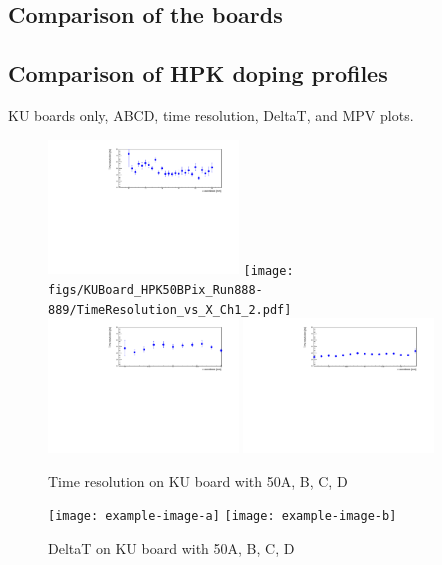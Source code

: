 \documentclass[preprint,1p]{elsarticle}
\begin{document}
\subsection{Comparison of the boards}


\subsection{Comparison of HPK doping profiles}

KU boards only, ABCD, time resolution, DeltaT, and MPV plots. 

\begin{figure}[htbp] 
\centering
\includegraphics[width=0.45\textwidth]{figs/KUBoard_HPK50APix_Run843-846/TimeResolution_vs_X_Ch1_2.pdf} 
\texttt{[image: figs/KUBoard\_HPK50BPix\_Run888-889/TimeResolution\_vs\_X\_Ch1\_2.pdf]} 
\includegraphics[width=0.45\textwidth]{figs/KUBoard_HPK50CPix_Run843-846/TimeResolution_vs_X_Ch3_4.pdf} 
\includegraphics[width=0.45\textwidth]{figs/KUBoard_HPK50DPix_Run638-781/TimeResolution_vs_X_Ch1_2.pdf} 
\caption{Time resolution on KU board with 50A, B, C, D } 
\label{fig:Sensors} 
\end{figure} 

\begin{figure}[htbp] 
\centering
\texttt{[image: example-image-a]} 
\texttt{[image: example-image-b]} 
\caption{DeltaT on KU board with 50A, B, C, D } 
\label{fig:Sensors} 
\end{figure} 
\end{document}
